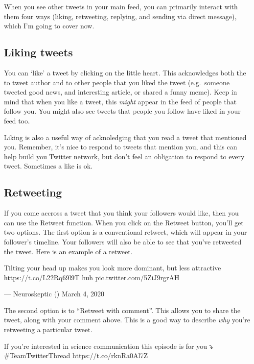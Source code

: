 \documentclass[]{book}
\begin{document}
When you see other tweets in your main feed, you can primarily interact with them four ways (liking, retweeting, replying, and sending via direct message), which I'm going to cover now.

\hypertarget{liking-tweets}{%
\subsection{Liking tweets}\label{liking-tweets}}

You can `like' a tweet by clicking on the little heart. This acknowledges both the to tweet author and to other people that you liked the tweet (e.g.~someone tweeted good news, and interesting article, or shared a funny meme). Keep in mind that when you like a tweet, this \emph{might} appear in the feed of people that follow you. You might also see tweets that people you follow have liked in your feed too.

Liking is also a useful way of acknoledging that you read a tweet that mentioned you. Remember, it's nice to respond to tweets that mention you, and this can help build you Twitter network, but don't feel an obligation to respond to every tweet. Sometimes a like is ok.

\hypertarget{retweeting}{%
\subsection{Retweeting}\label{retweeting}}

If you come accross a tweet that you think your followers would like, then you can use the Retweet function. When you click on the Retweet button, you'll get two options. The first option is a conventional retweet, which will appear in your follower's timeline. Your followers will also be able to see that you've retweeted the tweet. Here is an example of a retweet.

Tilting your head up makes you look more dominant, but less attractive https://t.co/L22Rq69l9T huh pic.twitter.com/5ZiJ9rgrAH

--- Neuroskeptic (\citet{Neuro_Skeptic}) March 4, 2020

The second option is to ``Retweet with comment''. This allows you to share the tweet, along with your comment above. This is a good way to describe \emph{why} you're retweeting a particular tweet.

If you're interested in science communication this episode is for you ⤵️ \#TeamTwitterThread https://t.co/rknRa0Al7Z
\end{document}
